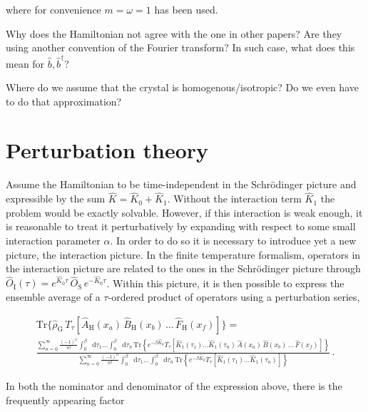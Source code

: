 \documentclass[12pt]{report}
\newcommand*\diff{\mathop{}\!\mathrm{d}}
\newcommand{\question}[1]{{\leavevmode\color{question}#1}}
\begin{document}
where for convenience $ m = \omega = 1 $ has been used.

\question{Why does the Hamiltonian not agree with the one in other papers? Are they using another convention of the Fourier transform? In such case, what does this mean for $ \hat b, \hat b^\dagger $?}

\question{Where do we assume that the crystal is homogenous/isotropic? Do we even have to do that approximation?}

\section{Perturbation theory}

Assume the Hamiltonian to be time-independent in the Schrödinger picture and expressible by the sum $ \hat K = \hat K_0 + \hat K_1 $. Without the interaction term $ \hat K_1 $ the problem would be exactly solvable. However, if this interaction is weak enough, it is reasonable to treat it perturbatively by expanding with respect to some small interaction parameter $ \alpha $. In order to do so it is necessary to introduce yet a new picture, the interaction picture. In the finite temperature formalism, operators in the interaction picture are related to the ones in the Schrödinger picture through $ \hat O_\text{I} (\tau) = e^{\hat K_0 \tau} \, \hat O_\text{S} \, e^{-\hat K_0 \tau} $. Within this picture, it is then possible to express the ensemble average of a $ \tau $-ordered product of operators using a perturbation series,

\begin{equation}
	\label{eq:perturbationSeries}
	\begin{split}
		\text{Tr} \{ \hat \rho_\text{G} \, T_\tau [\hat A_\text{H}(x_a) \, \hat B_\text{H}(x_b) \, \dots \, \hat F_\text{H}(x_f) ] \}
		= \\
		\frac{
			\sum_{n=0}^\infty \frac{(-1)^n}{n!} \int_0^\beta \diff \tau_1 \dots \int_0^\beta \diff \tau_n \, 
			\text{Tr} \left\{ e^{- \beta \hat K_0} T_\tau [\hat K_1 (\tau_1) \dots \hat K_1 (\tau_n) \, \hat A(x_a) \, \hat B(x_b) \, \dots \, \hat F(x_f)] \right\}
		}{
			\sum_{n=0}^\infty \frac{(-1)^n}{n!} \int_0^\beta \diff \tau_1 \dots \int_0^\beta \diff \tau_n \,
			\text{Tr} \left\{ e^{- \beta \hat K_0} T_\tau [\hat K_1 (\tau_1) \dots \hat K_1 (\tau_n)] \right\}
		} \,.
	\end{split}
\end{equation}



In both the nominator and denominator of the expression above, there is the frequently appearing factor
\end{document}
